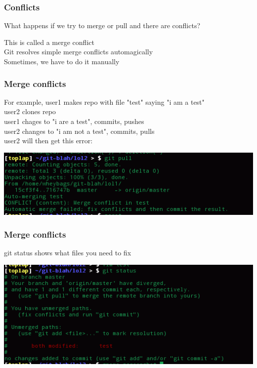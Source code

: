 \documentclass[xcolor=dvipsnames]{beamer}
\begin{document}
\begin{frame}
    \frametitle{Conflicts}

    What happens if we try to merge or pull and there are conflicts?\\\vbox{}
    
    This is called a merge conflict\\
    Git resolves simple merge conflicts automagically\\
    Sometimes, we have to do it manually\\
\end{frame}

\begin{frame}
    \frametitle{Merge conflicts}

    For example, user1 makes repo with file "test" saying "i am a test"\\
    user2 clones repo\\
    user1 chages to "i are a test", commits, pushes\\
    user2 changes to "i am not a test", commits, pulls\\

    user2 will then get this error:
    \begin{center}
        \includegraphics[scale=0.4]{mergeconflict1.png}
    \end{center}
\end{frame}

\begin{frame}
    \frametitle{Merge conflicts}

    git status shows what files you need to fix

    \begin{center}
        \includegraphics[scale=0.4]{mergeconflict2.png}
    \end{center}
\end{frame}
 
\end{document}
